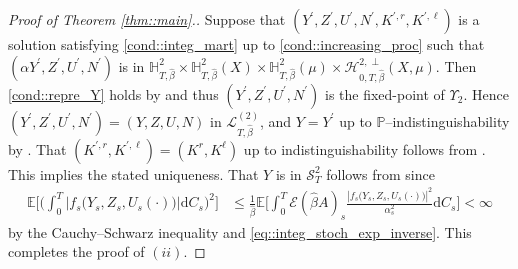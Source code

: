 \documentclass[10pt]{article} %
\newcommand\cE{\mathcal E}
\newcommand\cH{\mathcal H}
\newcommand\cL{\mathcal L}
\newcommand\cS{\mathcal S}
\def \E{\mathbb{E}}
\def \H{\mathbb{H}}
\def \P{\mathbb{P}}
\newcommand{\1}{\mathbf{1}}
\def\d{\mathrm{d}}
\begin{document}
\begin{proof}[Proof of Theorem \ref{thm::main}.]
	\medskip
	Suppose that $(Y^\prime,Z^\prime,U^\prime,N^\prime,K^{\prime,r},K^{\prime,\ell})$ is a solution satisfying \ref{cond::integ_mart} up to \ref{cond::increasing_proc} such that $(\alpha Y^\prime,Z^\prime,U^\prime,N^\prime)$ is in $\H^2_{T,\hat\beta} \times \H^2_{T,\hat\beta}(X) \times \H^2_{T,\hat\beta}(\mu) \times \cH^{2,\perp}_{0,T,\hat\beta}(X,\mu)$. Then \ref{cond::repre_Y} holds by  and thus $(Y^\prime,Z^\prime,U^\prime,N^\prime)$ is the fixed-point of $\Upsilon_2$. Hence $(Y^\prime,Z^\prime,U^\prime,N^\prime) = (Y,Z,U,N)$ in $\cL^{(2)}_{T,\hat\beta}$, and $Y = Y^\prime$ up to $\P$--indistinguishability by . That $(K^{\prime,r},K^{\prime,\ell}) = (K^r,K^\ell)$ up to indistinguishability follows from . 
	This implies the stated uniqueness. That $Y$ is in $\cS^2_T$ follows from  since
	\begin{align*}
		\E\bigg[\bigg(\int_0^T |f_s\big(Y_s,Z_s,U_s(\cdot)\big)| \d C_s\bigg)^2\bigg] 
		&\leq \frac{1}{\hat\beta}\E\bigg[\int_0^T \cE(\hat\beta A)_s\frac{|f_s\big(Y_s,Z_s,U_s(\cdot)\big)|^2}{\alpha^2_s} \d C_s\bigg] < \infty
	\end{align*}
	by the Cauchy--Schwarz inequality and \eqref{eq::integ_stoch_exp_inverse}.
	This completes the proof of $(ii)$. 
	

\end{proof}
\end{document}
